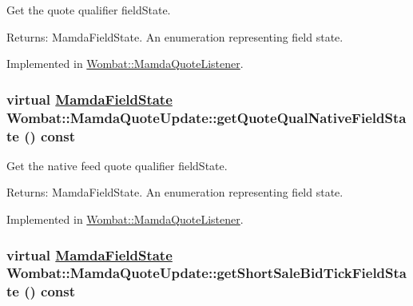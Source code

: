 Get the quote qualifier field\-State. 

\begin{Desc}
\item[Returns:]Mamda\-Field\-State. An enumeration representing field state. \end{Desc}


Implemented in \hyperlink{classWombat_1_1MamdaQuoteListener_90a6df719e3f391f19edf4796f947b35}{Wombat::Mamda\-Quote\-Listener}.\hypertarget{classWombat_1_1MamdaQuoteUpdate_bf4211f0b7c89b9a1f3353383b5ec2d4}{
\subsubsection[getQuoteQualNativeFieldState]{\setlength{\rightskip}{0pt plus 5cm}virtual \hyperlink{namespaceWombat_93aac974f2ab713554fd12a1fa3b7d2a}{Mamda\-Field\-State} Wombat::Mamda\-Quote\-Update::get\-Quote\-Qual\-Native\-Field\-State () const}}
\label{classWombat_1_1MamdaQuoteUpdate_bf4211f0b7c89b9a1f3353383b5ec2d4}


Get the native feed quote qualifier field\-State. 

\begin{Desc}
\item[Returns:]Mamda\-Field\-State. An enumeration representing field state. \end{Desc}


Implemented in \hyperlink{classWombat_1_1MamdaQuoteListener_9c5a520a83919f48b66dc8989d509c4c}{Wombat::Mamda\-Quote\-Listener}.\hypertarget{classWombat_1_1MamdaQuoteUpdate_a86e2dbc05a27389fac4c47282ebe6ee}{
\subsubsection[getShortSaleBidTickFieldState]{\setlength{\rightskip}{0pt plus 5cm}virtual \hyperlink{namespaceWombat_93aac974f2ab713554fd12a1fa3b7d2a}{Mamda\-Field\-State} Wombat::Mamda\-Quote\-Update::get\-Short\-Sale\-Bid\-Tick\-Field\-State () const}}
\label{classWombat_1_1MamdaQuoteUpdate_a86e2dbc05a27389fac4c47282ebe6ee}


